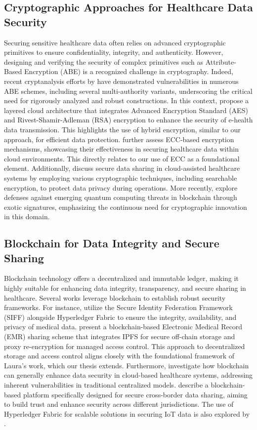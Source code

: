 \documentclass[cic,tc,english]{iiufrgs}
\begin{document}
        \subsection{Cryptographic Approaches for Healthcare Data Security}
            Securing sensitive healthcare data often relies on advanced cryptographic primitives to ensure confidentiality, integrity, and authenticity. However, designing and verifying the security of complex primitives such as Attribute-Based Encryption (ABE) is a recognized challenge in cryptography. Indeed, recent cryptanalysis efforts by \citet{broken2020} have demonstrated vulnerabilities in numerous ABE schemes, including several multi-authority variants, underscoring the critical need for rigorously analyzed and robust constructions. In this context, \citet{Memos2021} propose a layered cloud architecture that integrates Advanced Encryption Standard (AES) and Rivest-Shamir-Adleman (RSA) encryption to enhance the security of e-health data transmission. This highlights the use of hybrid encryption, similar to our approach, for efficient data protection. \citet{Hema2019} further assess ECC-based encryption mechanisms, showcasing their effectiveness in securing healthcare data within cloud environments. This directly relates to our use of ECC as a foundational element. Additionally, \citet{XuChang2019} discuss secure data sharing in cloud-assisted healthcare systems by employing various cryptographic techniques, including searchable encryption, to protect data privacy during operations. More recently, \citet{Naz2024} explore defenses against emerging quantum computing threats in blockchain through exotic signatures, emphasizing the continuous need for cryptographic innovation in this domain.


        \subsection{Blockchain for Data Integrity and Secure Sharing}
            Blockchain technology offers a decentralized and immutable ledger, making it highly suitable for enhancing data integrity, transparency, and secure sharing in healthcare. Several works leverage blockchain to establish robust security frameworks. For instance, \citet{Tian2019} utilize the Secure Identity Federation Framework (SIFF) alongside Hyperledger Fabric to ensure the integrity, availability, and privacy of medical data. \citet{Liu2024} present a blockchain-based Electronic Medical Record (EMR) sharing scheme that integrates IPFS for secure off-chain storage and proxy re-encryption for managed access control. This approach to decentralized storage and access control aligns closely with the foundational framework of Laura's work, which our thesis extends. Furthermore, \citet{Esposito2018} investigate how blockchain can generally enhance data security in cloud-based healthcare systems, addressing inherent vulnerabilities in traditional centralized models. \citet{Rahman2020} describe a blockchain-based platform specifically designed for secure cross-border data sharing, aiming to build trust and enhance security across different jurisdictions. The use of Hyperledger Fabric for scalable solutions in securing IoT data is also explored by \citet{Eghmazi2024}.
\end{document}
